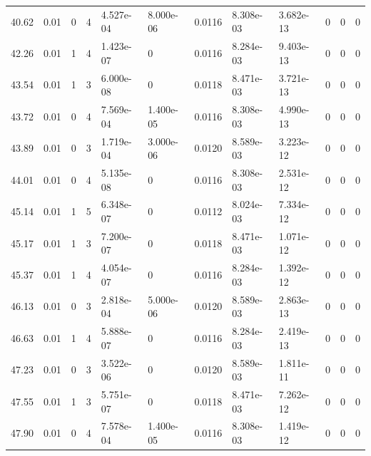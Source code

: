 \documentclass[preview]{standalone}
\begin{document}
{{{\begin{tabular}{L{1.2cm}C{1.2cm} C{0.3cm}C{0.5cm} C{1.4cm}C{1.4cm} C{1.4cm}C{1.4cm} C{1.6cm}C{1.6cm} C{1.6cm}C{1.6cm}}
  40.62  &  0.01  & 0     &  4 &  4.527e-04  & 8.000e-06  &  0.0116&   8.308e-03& 3.682e-13 & 0   &  0 & 0  \\ 
  42.26  &  0.01  & 1     &  4 &  1.423e-07  & 0  &  0.0116&   8.284e-03& 9.403e-13 & 0   &  0 & 0  \\ 
  43.54  &  0.01  & 1     &  3 &  6.000e-08  & 0  &  0.0118&   8.471e-03& 3.721e-13 & 0   &  0 & 0  \\ 
  43.72  &  0.01  & 0     &  4 &  7.569e-04  & 1.400e-05  &  0.0116&   8.308e-03& 4.990e-13 & 0   &  0 & 0  \\ 
  43.89  &  0.01  & 0     &  3 &  1.719e-04  & 3.000e-06  &  0.0120&   8.589e-03& 3.223e-12 & 0   &  0 & 0  \\ 
  44.01  &  0.01  & 0     &  4 &  5.135e-08  & 0  &  0.0116&   8.308e-03& 2.531e-12 & 0   &  0 & 0  \\ 
  45.14  &  0.01  & 1     &  5 &  6.348e-07  & 0  &  0.0112&   8.024e-03& 7.334e-12 & 0   &  0 & 0  \\ 
  45.17  &  0.01  & 1     &  3 &  7.200e-07  & 0  &  0.0118&   8.471e-03& 1.071e-12 & 0   &  0 & 0  \\ 
  45.37  &  0.01  & 1     &  4 &  4.054e-07  & 0  &  0.0116&   8.284e-03& 1.392e-12 & 0   &  0 & 0  \\ 
  46.13  &  0.01  & 0     &  3 &  2.818e-04  & 5.000e-06  &  0.0120&   8.589e-03& 2.863e-13 & 0   &  0 & 0  \\ 
  46.63  &  0.01  & 1     &  4 &  5.888e-07  & 0  &  0.0116&   8.284e-03& 2.419e-13 & 0   &  0 & 0  \\ 
  47.23  &  0.01  & 0     &  3 &  3.522e-06  & 0  &  0.0120&   8.589e-03& 1.811e-11 & 0   &  0 & 0  \\ 
  47.55  &  0.01  & 1     &  3 &  5.751e-07  & 0  &  0.0118&   8.471e-03& 7.262e-12 & 0   &  0 & 0  \\ 
  47.90  &  0.01  & 0     &  4 &  7.578e-04  & 1.400e-05  &  0.0116&   8.308e-03& 1.419e-12 & 0   &  0 & 0  \\ 
\hline 
\end{tabular} 

}}}
\end{document}
